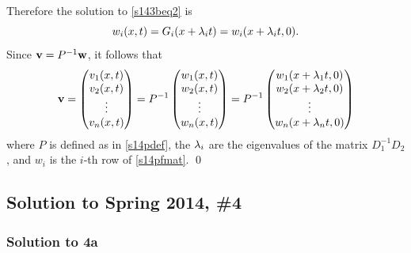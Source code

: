 Therefore the solution to \eqref{s143beq2} is $$w_{i}(x, t) = G_{i}(x + \lambda_{i}t) = w_{i}(x + \lambda_{i}t, 0).$$ Since $\mathbf{v} = P^{-1}\mathbf{w}$,
it follows that
\begin{align*}
\mathbf{v} = \begin{pmatrix}
v_{1}(x, t)\\
v_{2}(x, t)\\
\vdots\\
v_{n}(x, t)
\end{pmatrix}=
P^{-1}
\begin{pmatrix}
w_{1}(x, t)\\
w_{2}(x, t)\\
\vdots\\
w_{n}(x, t)
\end{pmatrix}=
P^{-1}
\begin{pmatrix}
w_{1}(x + \lambda_{1}t, 0)\\
w_{2}(x + \lambda_{2}t, 0)\\
\vdots\\
w_{n}(x + \lambda_{n}t, 0)
\end{pmatrix}
\end{align*}
where $P$ is defined as in \eqref{s14pdef}, the $\lambda_{i}$ are the eigenvalues of the matrix $D_{1}^{-1}D_{2}$, and $w_{i}$ is the $i$-th row of \eqref{s14pfmat}.
\hfill\qed

\subsection*{Solution to Spring 2014, \#4}\label{s144}

\subsubsection*{Solution to 4a}

